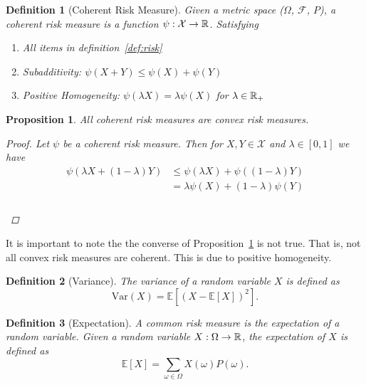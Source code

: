 \documentclass[10pt]{article}
\newtheorem{definition}{Definition}
\theoremstyle{plain}
\newtheorem{proposition}{Proposition}
\theoremstyle{remark}
\begin{document}
\begin{definition}[Coherent Risk Measure]\label{def:coherent-risk-measure}
        Given a metric space ($\Omega$, $\mathcal{F}$, $P$), a coherent risk measure is a function $\psi: \mathcal{X} \to \mathbb{R}$. Satisfying
        \begin{enumerate}
                \item All items in definition~\ref{def:risk}
                \item Subadditivity: $\psi(X + Y) \leq \psi(X) + \psi(Y)$
                \item Positive Homogeneity: $\psi(\lambda X) = \lambda \psi(X)$ for $\lambda \in \mathbb{R}_+$
        \end{enumerate}
\end{definition}

\begin{proposition}\label{prop:coherent-convex}
        All coherent risk measures are convex risk measures.
        \begin{proof}
                Let $\psi$ be a coherent risk measure. Then for $X, Y \in \mathcal{X}$ and $\lambda \in [0, 1]$ we have
                \begin{align*}
                        \psi(\lambda X + (1 - \lambda) Y) &\leq \psi(\lambda X) + \psi((1 - \lambda) Y) \\
                        &= \lambda \psi(X) + (1 - \lambda) \psi(Y) \\
                \end{align*} \\
        \end{proof}
\end{proposition}

It is important to note the the converse of Proposition~\ref{prop:coherent-convex} is not true. That is, not all convex risk measures are coherent. This is due to positive homogeneity.

\begin{definition}[Variance]\label{def:variance}
        The variance of a random variable $X$ is defined as 
        \[
                \text{Var}(X) = \mathbb{E}[(X - \mathbb{E}[X])^2].
        \]
\end{definition}

\begin{definition}[Expectation]
        \label{def:expectation}
        A common risk measure is the expectation of a random variable. Given a random variable $X: \Omega \to \mathbb{R}$, the expectation of $X$ is defined as
        $$\mathbb{E}[X] = \sum_{\omega \in \Omega} X(\omega) P(\omega).$$
\end{definition}
\end{document}
